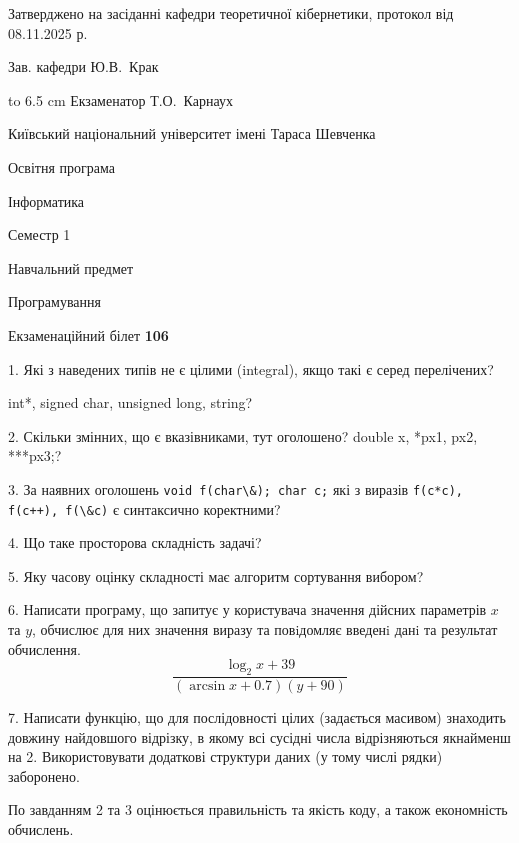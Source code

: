\documentclass[12pt, ukrainian]{article}
\def\code#1{\Verb!#1!}
\begin{document}
{\smallskip\smallskip \begin {scriptsize} Затверджено на засіданні кафедри теоретичної кібернетики, протокол   від   08.11.2025 р.\par\smallskip\smallskip\smallskip\smallskip
{\parbox {6.5 cm} {Зав. кафедри \dotfill Ю.В.~Крак}}\hspace {0.7cm} {\hbox to 6.5 cm { Екзаменатор \dotfill Т.О.~Карнаух}} \end{scriptsize}}
\vspace{0.9cm}
{{\begin {scriptsize}\par
{ \center  Київський національний університет імені Тараса Шевченка \par}
{\parbox {5 cm}{Освітня програма \hfill}{\parbox {7 cm}{Інформатика\hfill}}\parbox {6 cm}{\hfill Семестр 1}}\par
{\parbox {5 cm} {Навчальний предмет \hfill}\parbox {7 cm}{Програмування \hfill}\parbox {6cm}{\hfill}\par}\vspace{-15pt} \end{scriptsize}}{\center Екзаменаційний білет \No \textbf { 106 }\par}}
{%
1. Які з наведених типів не є цілими (integral), якщо такі є серед перелічених?

int*, signed char, unsigned long, string?
\par
\vspace{2mm}
2. Скільки змінних, що є вказівниками, тут оголошено?
double x, *px1, px2, ***px3;?
\par
\vspace{2mm}
3. За наявних оголошень \code{void f(char\&); char c;} які з виразів \code{f(c*c), f(c++), f(\&c)} є синтаксично коректними?
\par
\vspace{2mm}
4. Що таке просторова складність задачі?
\par
\vspace{2mm}
5. Яку часову оцінку складності має алгоритм сортування вибором?
\par
\vspace{2mm}
6. Написати програму, що запитує у користувача значення дійсних параметрів $x$ та $y$, обчислює для них значення виразу та повiдомляє введенi данi та результат обчислення.
$$\frac{\log_{2} x + 39}{(\arcsin x + 0.7) (y + 90)}$$ 

\par
7. Написати функцію, що для послідовності цілих (задається масивом) знаходить довжину найдовшого відрізку, в якому всі сусідні числа відрізняються якнайменш на 2. Використовувати додаткові структури даних (у тому числі рядки) заборонено.

По завданням 2 та 3 оцінюється правильність та якість коду, а також економність обчислень.

}
\end{document}
